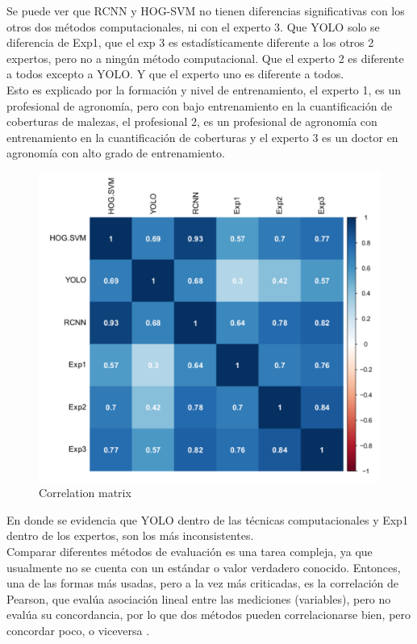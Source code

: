 \documentclass[journal,article,submit,moreauthors,pdftex]{Definitions/mdpi}
\begin{document}
Se puede ver que RCNN y HOG-SVM no tienen diferencias significativas con los otros dos métodos computacionales, ni con el experto 3. Que YOLO solo se diferencia de Exp1, que el exp 3 es estadísticamente diferente a los otros 2 expertos, pero no a ningún método computacional. Que el experto 2 es diferente a todos excepto a YOLO. Y que el experto uno es diferente a todos.
\\
Esto es explicado por la formación y nivel de entrenamiento, el experto 1, es un profesional de agronomía, pero con bajo entrenamiento en la cuantificación de coberturas de malezas, el profesional 2, es un profesional de agronomía con entrenamiento en la cuantificación de coberturas y el experto 3 es un doctor en agronomía con alto grado de entrenamiento. 

\begin{figure}[H]
    \centering
    \includegraphics[scale=0.5]{corrmatrix.pdf}
     \centering
    \caption{Correlation matrix}
\end{figure}
En donde se evidencia que YOLO dentro de las técnicas computacionales y Exp1 dentro de los expertos, son los más inconsistentes.
\\
Comparar diferentes métodos de evaluación es una tarea compleja, ya que usualmente no se cuenta con un estándar o valor verdadero conocido. Entonces, una de las formas más usadas, pero a la vez más criticadas, es la correlación de Pearson, que evalúa asociación lineal entre las mediciones (variables), pero no evalúa su concordancia, por lo que dos métodos pueden correlacionarse bien, pero concordar poco, o viceversa \cite{c57}.
\\
\end{document}
